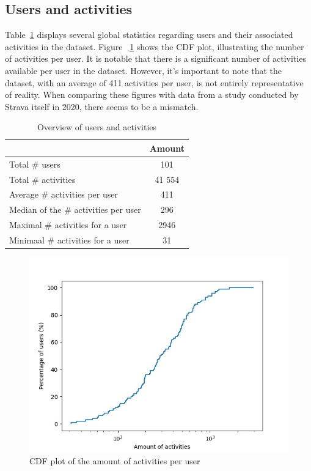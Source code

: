 \documentclass[conference]{IEEEtran}
\begin{document}
\subsection{Users and activities}
Table~\ref{tab:stats_dataset} displays several global statistics regarding
users and their associated activities in the dataset. Figure
~\ref{fig:cdf_amount_activities} shows the CDF plot, illustrating the number of
activities per user. It is notable that there is a significant number of
activities available per user in the dataset. However, it's important to note
that the dataset, with an average of 411 activities per user, is not entirely
representative of reality. When comparing these figures with data from a study
conducted by Strava itself in 2020, there seems to be a mismatch.
\begin{table}[h]
    \centering
    \begin{tabular}{|l||c|}
        \hline
                                             & \textbf{Amount} \\
        \hline \hline
        Total \# users                       & 101             \\
        \hline
        Total \# activities                  & 41 554          \\
        \hline
        Average \# activities per user       & 411             \\
        \hline
        Median of the \# activities per user & 296             \\
        \hline
        Maximal \# activities for a user     & 2946            \\
        \hline
        Minimaal \# activities for a user    & 31              \\
        \hline
    \end{tabular}
    \captionsetup{justification=centering}
    \caption{Overview of users and activities}\label{tab:stats_dataset}
\end{table}
\begin{figure}[h]
    \centering
    \includegraphics[width=0.8\linewidth]{fig/Afwijkingen&Analyses/CDF_amountActivities.jpg}
    \caption{CDF plot of the amount of activities per user}\label{fig:cdf_amount_activities}
\end{figure}
\end{document}
